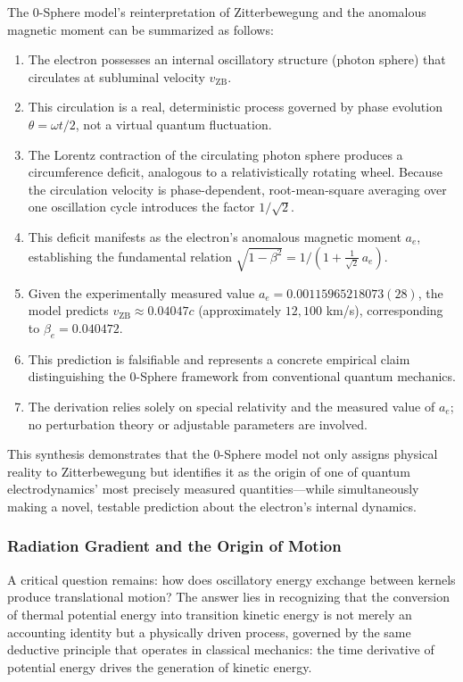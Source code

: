 \documentclass[12pt,letterpaper]{article}
\begin{document}
The 0-Sphere model's reinterpretation of Zitterbewegung and the anomalous magnetic moment can be summarized as follows:
\begin{enumerate}
\item The electron possesses an internal oscillatory structure (photon sphere) that circulates at subluminal velocity $v_{\mathrm{ZB}}$.
\item This circulation is a real, deterministic process governed by phase evolution $\theta = \omega t/2$, not a virtual quantum fluctuation.
\item The Lorentz contraction of the circulating photon sphere produces a circumference deficit, analogous to a relativistically rotating wheel. Because the circulation velocity is phase-dependent, root-mean-square averaging over one oscillation cycle introduces the factor $1/\sqrt{2}$.
\item This deficit manifests as the electron's anomalous magnetic moment $a_e$, establishing the fundamental relation $\sqrt{1 - \beta^2} = 1/\!\left(1 + \frac{1}{\sqrt{2}}\,a_e\right)$.
\item Given the experimentally measured value $a_e = 0.00115965218073(28)$, the model predicts $v_{\mathrm{ZB}} \approx 0.04047c$ (approximately $12{,}100$ km/s), corresponding to $\beta_e = 0.040472$.
\item This prediction is falsifiable and represents a concrete empirical claim distinguishing the 0-Sphere framework from conventional quantum mechanics.
\item The derivation relies solely on special relativity and the measured value of $a_e$; no perturbation theory or adjustable parameters are involved.
\end{enumerate}

This synthesis demonstrates that the 0-Sphere model not only assigns physical reality to Zitterbewegung but identifies it as the origin of one of quantum electrodynamics' most precisely measured quantities---while simultaneously making a novel, testable prediction about the electron's internal dynamics.


\subsubsection{Radiation Gradient and the Origin of Motion}
\label{subsubsec:radiation_gradient}
A critical question remains: how does oscillatory energy exchange between kernels produce translational motion? The answer lies in recognizing that the conversion of thermal potential energy into transition kinetic energy is not merely an accounting identity but a physically driven process, governed by the same deductive principle that operates in classical mechanics: the time derivative of potential energy drives the generation of kinetic energy.
\end{document}

